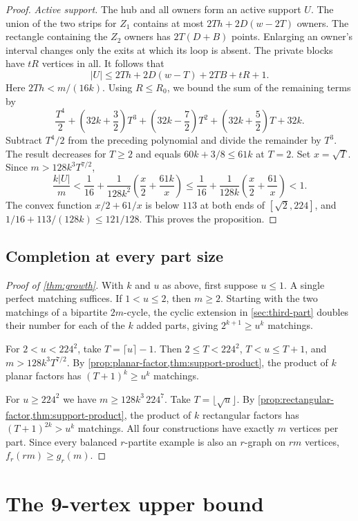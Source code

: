 \documentclass[10pt]{article}
\numberwithin{equation}{section}
\theoremstyle{definition}
\begin{document}
\begin{proof}
\emph{Active support.}
The hub and all owners form an active support $U$. The union of the two strips for $Z_1$ contains at most $2Th+2D(w-2T)$ owners. The rectangle containing the $Z_2$ owners has $2T(D+B)$ points. Enlarging an owner's interval changes only the exits at which its loop is absent. The private blocks have $tR$ vertices in all. It follows that
\[
 |U|\le 2Th+2D(w-T)+2TB+tR+1.
\]
Here $2Th<m/(16k)$. Using $R\le R_0$, we bound the sum of the remaining terms by
\[
 \frac{T^4}{2}+\left(32k+\frac32\right)T^3+\left(32k-\frac72\right)T^2
       +\left(32k+\frac52\right)T+32k.
\]
Subtract $T^4/2$ from the preceding polynomial and divide the remainder by $T^3$. The result decreases for $T\ge2$ and equals $60k+3/8\le61k$ at $T=2$. Set $x=\sqrt T$. Since $m>128k^3T^{7/2}$,
\[
 \frac{k|U|}{m}
 <\frac1{16}+\frac{1}{128k^2}\left(\frac{x}{2}+\frac{61k}{x}\right)
 \le\frac1{16}+\frac{1}{128k}\left(\frac{x}{2}+\frac{61}{x}\right)<1.
\]
The convex function $x/2+61/x$ is below $113$ at both ends of $[\sqrt2,224]$, and $1/16+113/(128k)\le121/128$. This proves the proposition.
\end{proof}

\subsection{Completion at every part size}

\begin{proof}[Proof of \cref{thm:growth}]
With $k$ and $u$ as above, first suppose $u\le1$. A single perfect matching suffices. If $1<u\le2$, then $m\ge2$. Starting with the two matchings of a bipartite $2m$-cycle, the cyclic extension in \cref{sec:third-part} doubles their number for each of the $k$ added parts, giving $2^{k+1}\ge u^k$ matchings.

For $2<u<224^2$, take $T=\lceil u\rceil-1$. Then $2\le T<224^2$, $T<u\le T+1$, and $m>128k^3T^{7/2}$. By \cref{prop:planar-factor,thm:support-product}, the product of $k$ planar factors has $(T+1)^k\ge u^k$ matchings.

For $u\ge224^2$ we have $m\ge128k^3\,224^7$. Take $T=\lfloor\sqrt u\rfloor$. By \cref{prop:rectangular-factor,thm:support-product}, the product of $k$ rectangular factors has $(T+1)^{2k}>u^k$ matchings. All four constructions have exactly $m$ vertices per part. Since every balanced $r$-partite example is also an $r$-graph on $rm$ vertices, $f_r(rm)\ge g_r(m)$.
\end{proof}

\section{The 9-vertex upper bound}\label{app:finite}
\end{document}
